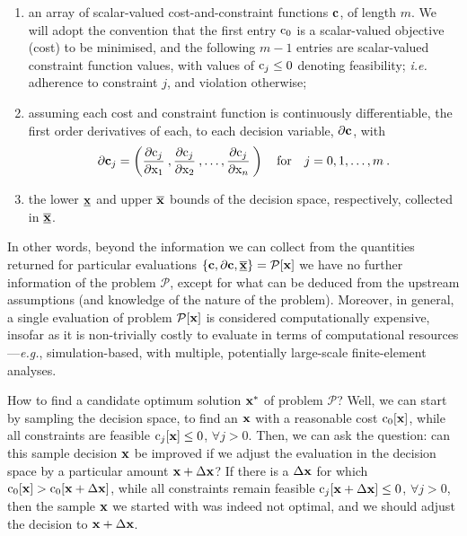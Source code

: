 \documentclass[11pt]{article}
\begin{document}
\begin{enumerate}[label=(\roman*)]
  \item an array of scalar-valued cost-and-constraint functions $\mathbf{c}$, of length $m$. We will adopt the convention that the first entry $\textrm{c}_0$ is a scalar-valued objective (cost) to be minimised, and the following $m-1$ entries are scalar-valued constraint function values, with values of $\textrm{c}_j \leq 0$ denoting feasibility; \emph{i.e.} adherence to constraint $j$, and violation otherwise;
  \item assuming each cost and constraint function is continuously differentiable, the first order derivatives of each, to each decision variable, $\mathbf{\partial c}$, with
\begin{equation}
\mathbf{\partial c }_j = \left( \frac{\partial \textrm{c}_j}{\partial \textrm{x}_1 } \:,  \frac{\partial \textrm{c}_j}{\partial \textrm{x}_2} \: , \ldots,  \frac{\partial \textrm{c}_j}{\partial \textrm{x}_n} \: \right) \quad \text{for} \quad j = 0,1, \ldots, m \:.
\end{equation}
  \item the  lower $\underline{\mathbf{x}}$ and upper $\overline{\mathbf{x}}$ bounds of the decision space, respectively, collected in $\underline{\overline{\mathbf{x}}}$.
\end{enumerate}

In other words, beyond the information we can collect from the quantities returned for particular evaluations $\left\{\mathbf{c}, \partial \mathbf{c}, \underline{\overline{\mathbf{x}}}\right\}=\mathcal{P}[\mathbf{x}]$ we have no further information of the problem $\mathcal{P}$, except for what can be deduced from the upstream assumptions (and knowledge of the nature of the problem). Moreover, in general, a single evaluation of problem $\mathcal{P}[\mathbf{x}]$ is considered computationally expensive, insofar as it is non-trivially costly to evaluate in terms of computational resources---\emph{e.g.}, simulation-based, with multiple, potentially large-scale finite-element analyses.

How to find a candidate optimum solution $\mathbf{x}^\ast$ of problem $\mathcal{P}$?  Well, we can start by sampling the decision space, to find an $\mathbf{x}$ with a reasonable cost $\textrm{c}_0 [\mathbf{x}]$, while all constraints are feasible $\textrm{c}_j [\mathbf{x}] \leq 0$, $\forall j > 0$. Then, we can ask the question: can this sample decision $\mathbf{x}$ be improved if we adjust the evaluation in the decision space by a particular amount $\mathbf{x} + \Delta \mathbf{x}$? If there is a $\Delta \mathbf{x}$ for which $\textrm{c}_0 [\mathbf{x}] > \textrm{c}_0 [\mathbf{x} + \Delta\mathbf{x}]$, while all constraints remain feasible $\textrm{c}_j [\mathbf{x} + \Delta \mathbf{x}] \leq 0$, $\forall j > 0$, then the sample $\mathbf{x}$ we started with was indeed not optimal, and we should adjust the decision to $\mathbf{x} + \Delta \mathbf{x}$.
\end{document}
